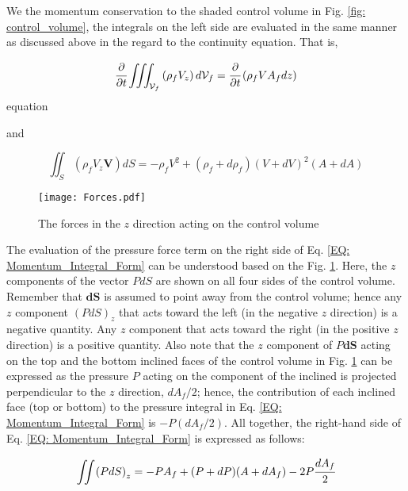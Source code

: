 \documentclass[../Article_Model_Parameters.tex]{subfiles}
\begin{document}
	We the momentum conservation to the shaded control volume in Fig. \ref{fig: control_volume}, the integrals on the left side are evaluated in the same manner as discussed above in the regard to the continuity equation. That is,
	
	{\footnotesize
		\begin{equation}
			\cfrac{\partial}{\partial t} \iiint_{\mathcal{V}_f} \left( \rho_f V_z \right) d \mathcal{V}_f = \cfrac{\partial}{\partial t} \left( \rho_f V A_f dz \right)
			\label{EQ: Force_Continuity_Monenmtum}
		\end{equation}equation
	}
	
	and 
	
	{\footnotesize
		\begin{equation}
			\iint_S \left( \rho_f V_z \textbf{V} \right) dS = -\rho_f V^2 + \left( \rho_f + d \rho_f \right) \left( V+dV \right)^2 \left( A+dA \right)
		\end{equation}
	}
	
	\begin{figure}[h]
		\centering
		\texttt{[image: Forces.pdf]}
		\caption{The forces in the $z$ direction acting on the control volume}
		\label{fig: Forces_Momentum_Control_Volume}
	\end{figure}
	
	The evaluation of the pressure force term on the right side of Eq. \ref{EQ: Momentum_Integral_Form} can be understood based on the Fig. \ref{fig: Forces_Momentum_Control_Volume}. Here, the $z$ components of the vector $PdS$ are shown on all four sides of the control volume. Remember that $\textbf{dS}$ is assumed to point away from the control volume; hence  any $z$ component $\left( PdS \right)_z$ that acts toward the left (in the negative $z$ direction) is a negative quantity. Any $z$ component that acts toward the right (in the positive $z$ direction) is a positive quantity. Also note that the $z$ component of $P\textbf{dS}$ acting on the top and the bottom inclined faces of the control volume in Fig. \ref{fig: Forces_Momentum_Control_Volume} can be expressed as the pressure $P$ acting on the component of the inclined is projected perpendicular to the $z$ direction, $dA_f/2$; hence, the contribution of each inclined face (top or bottom) to the pressure integral in Eq. \ref{EQ: Momentum_Integral_Form} is $-P(dA_f/2)$. All together, the right-hand side of Eq. \ref{EQ: Momentum_Integral_Form} is expressed as follows:
	
	{\footnotesize
		\begin{equation}
			\iint \left( PdS \right)_z = -PA_f + (P+dP)(A+dA_f)-2P\cfrac{dA_f}{2}
			\label{EQ: Force_Integral_Varying_Cross_Section}
		\end{equation}
	}
	
\end{document}
